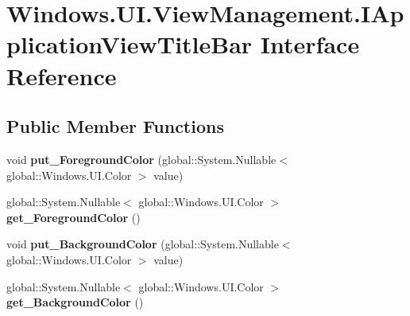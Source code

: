 \hypertarget{interface_windows_1_1_u_i_1_1_view_management_1_1_i_application_view_title_bar}{}\section{Windows.\+U\+I.\+View\+Management.\+I\+Application\+View\+Title\+Bar Interface Reference}
\label{interface_windows_1_1_u_i_1_1_view_management_1_1_i_application_view_title_bar}
\subsection*{Public Member Functions}
\begin{DoxyCompactItemize}
\item 
\mbox{\label{interface_windows_1_1_u_i_1_1_view_management_1_1_i_application_view_title_bar_a2c9b8e377e58bb9b24d1831d431d7cb8}} 
void {\bfseries put\+\_\+\+Foreground\+Color} (global\+::\+System.\+Nullable$<$ global\+::\+Windows.\+U\+I.\+Color $>$ value)
\item 
\mbox{\label{interface_windows_1_1_u_i_1_1_view_management_1_1_i_application_view_title_bar_a5fe06168420ee342f2b206c5db71e9d4}} 
global\+::\+System.\+Nullable$<$ global\+::\+Windows.\+U\+I.\+Color $>$ {\bfseries get\+\_\+\+Foreground\+Color} ()
\item 
\mbox{\label{interface_windows_1_1_u_i_1_1_view_management_1_1_i_application_view_title_bar_a8f1570efd073d4f98de8305ea238203d}} 
void {\bfseries put\+\_\+\+Background\+Color} (global\+::\+System.\+Nullable$<$ global\+::\+Windows.\+U\+I.\+Color $>$ value)
\item 
\mbox{\label{interface_windows_1_1_u_i_1_1_view_management_1_1_i_application_view_title_bar_af30b2ae748ffe820b7b1c6f69ef893b1}} 
global\+::\+System.\+Nullable$<$ global\+::\+Windows.\+U\+I.\+Color $>$ {\bfseries get\+\_\+\+Background\+Color} ()
\item 
\mbox{\label{interface_windows_1_1_u_i_1_1_view_management_1_1_i_application_view_title_bar_a79b0e9d27826cb5e56af8d4a73f6cd2f}} 

\end{DoxyCompactItemize}
